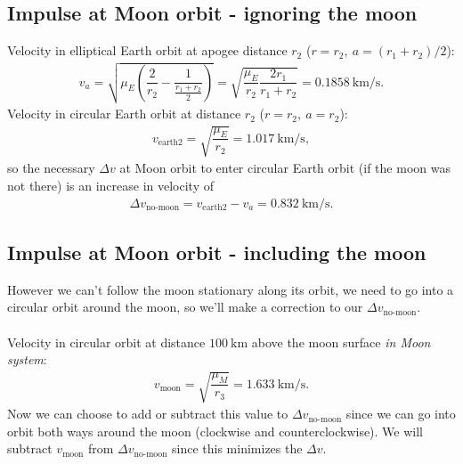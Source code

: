 \subsection{Impulse at Moon orbit - ignoring the moon}
Velocity in elliptical Earth orbit at apogee distance $r_2$ ($r = r_2,\ a = (r_1+r_2)/2$):
\begin{align}
v_a = \sqrt{\mu_E\left(\dfrac{2}{r_2} - \dfrac{1}{\frac{r_1+r_2}{2}}\right)} = \sqrt{\dfrac{\mu_E}{r_2} \dfrac{2 r_1}{r_1+r_2}} = \SI{0.1858}{\km\per\s}. \label{eq:va}
\end{align}
Velocity in circular Earth orbit at distance $r_2$ ($r = r_2,\ a = r_2$):
\begin{align}
v_{\text{earth2}} = \sqrt{\dfrac{\mu_E}{r_2}} = \SI{1.017}{\km\per\s},
\end{align}
so the necessary $\Delta v$ at Moon orbit to enter circular Earth orbit (if the moon was not there) is an increase in velocity of
\begin{align}
\Delta v_{\text{no-moon}} = v_{\text{earth2}} - v_a = \SI{0.832}{\km\per\s}.
\end{align}

\subsection{Impulse at Moon orbit - including the moon}
However we can't follow the moon stationary along its orbit, we need to go into a circular orbit around the moon, so we'll make a correction to our $\Delta v_{\text{no-moon}}$.\\
\\
Velocity in circular orbit at distance $\SI{100}{\km}$ above the moon surface \emph{in Moon system}:
\begin{align}
v_{\text{moon}} = \sqrt{\dfrac{\mu_M}{r_3}} = \SI{1.633}{\km\per\s}.
\end{align}
Now we can choose to add or subtract this value to $\Delta v_{\text{no-moon}}$ since we can go into orbit both ways around the moon (clockwise and counterclockwise). We will subtract $v_{\text{moon}}$ from $\Delta v_{\text{no-moon}}$ since this minimizes the $\Delta v$.

